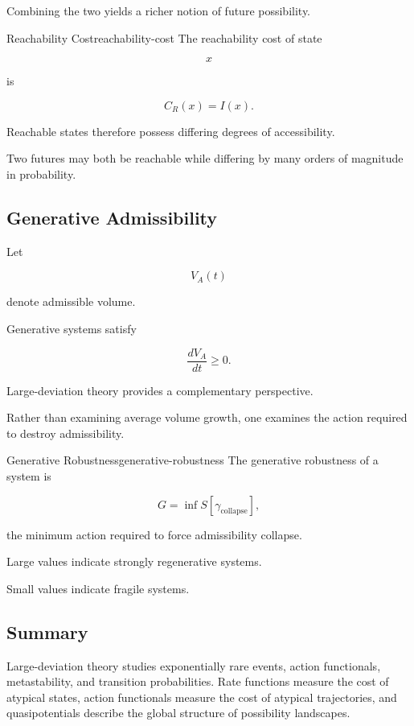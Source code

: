 \documentclass[12pt,twoside,openright]{book}
\begin{document}
Combining the two yields a richer notion of future
possibility.

\begin{definition}{Reachability Cost}{reachability-cost}
The reachability cost of state

\[
x
\]

is

\[
C_R(x)
=
I(x).
\]
\end{definition}

Reachable states therefore possess differing degrees of
accessibility.

Two futures may both be reachable while differing by many
orders of magnitude in probability.

\subsection{Generative Admissibility}

Let

\[
V_A(t)
\]

denote admissible volume.

Generative systems satisfy

\[
\frac{dV_A}{dt}
\ge0.
\]

Large-deviation theory provides a complementary
perspective.

Rather than examining average volume growth, one examines
the action required to destroy admissibility.

\begin{definition}{Generative Robustness}{generative-robustness}
The generative robustness of a system is

\[
G
=

\inf
S[\gamma_{\mathrm{collapse}}],
\]

the minimum action required to force admissibility
collapse.
\end{definition}

Large values indicate strongly regenerative systems.

Small values indicate fragile systems.

\subsection{Summary}

Large-deviation theory studies exponentially rare events,
action functionals, metastability, and transition
probabilities. Rate functions measure the cost of
atypical states, action functionals measure the cost of
atypical trajectories, and quasipotentials describe the
global structure of possibility landscapes.
\end{document}
